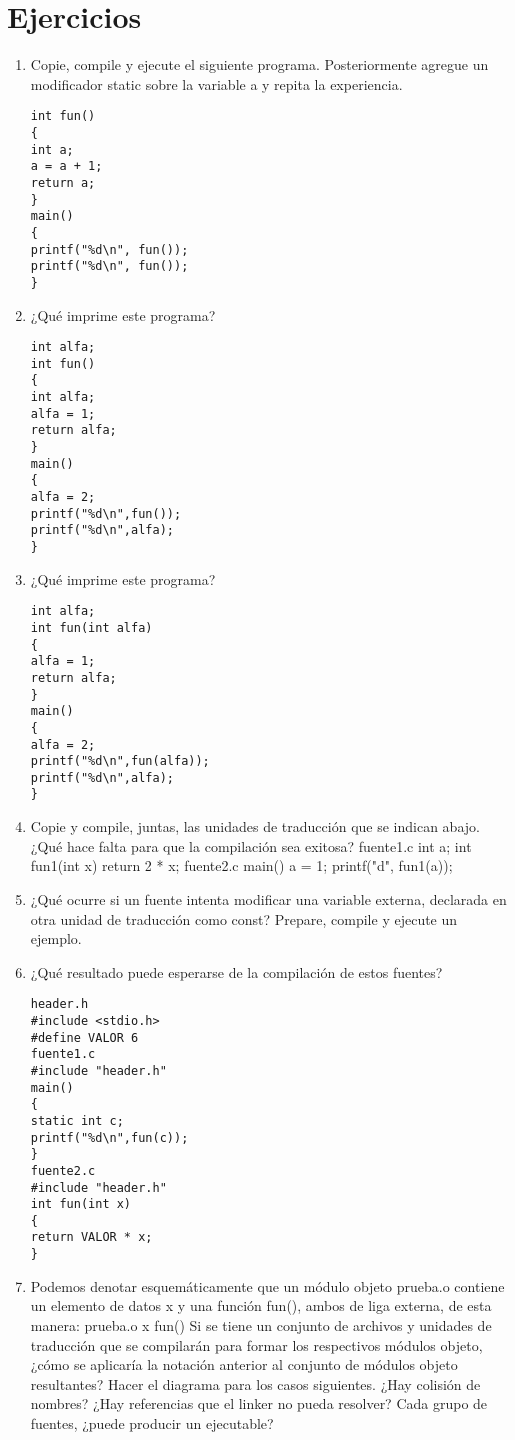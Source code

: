 \section{Ejercicios}
\begin{enumerate}
	\item Copie, compile y ejecute el siguiente programa. Posteriormente agregue un modificador static sobre
la variable a y repita la experiencia.
\begin{lstlisting}
int fun()
{
int a;
a = a + 1;
return a;
}
main()
{
printf("%d\n", fun());
printf("%d\n", fun());
}
\end{lstlisting}
\item ¿Qué imprime este programa?
\begin{lstlisting}
int alfa;
int fun()
{
int alfa;
alfa = 1;
return alfa;
}
main()
{
alfa = 2;
printf("%d\n",fun());
printf("%d\n",alfa);
}
\end{lstlisting}
\item ¿Qué imprime este programa?
\begin{lstlisting}
int alfa;
int fun(int alfa)
{
alfa = 1;
return alfa;
}
main()
{
alfa = 2;
printf("%d\n",fun(alfa));
printf("%d\n",alfa);
}
\end{lstlisting}
 \item Copie y compile, juntas, las unidades de traducción que se indican abajo. ¿Qué hace falta para que
la compilación sea exitosa?
fuente1.c
int a;
int fun1(int x)
{
return 2 * x;
}
fuente2.c
main()
{
a = 1;
printf("d\n", fun1(a));
}
\item ¿Qué ocurre si un fuente intenta modificar una variable externa, declarada en otra unidad de
traducción como const? Prepare, compile y ejecute un ejemplo.
\item ¿Qué resultado puede esperarse de la compilación de estos fuentes?
\begin{lstlisting}
header.h
#include <stdio.h>
#define VALOR 6
fuente1.c
#include "header.h"
main()
{
static int c;
printf("%d\n",fun(c));
}
fuente2.c
#include "header.h"
int fun(int x)
{
return VALOR * x;
}
\end{lstlisting}
\item Podemos denotar esquemáticamente que un módulo objeto prueba.o contiene un elemento de datos
x y una función fun(), ambos de liga externa, de esta manera:
prueba.o
x
fun()
Si se tiene un conjunto de archivos y unidades de traducción que se compilarán para formar los
respectivos módulos objeto, ¿cómo se aplicaría la notación anterior al conjunto de módulos objeto
resultantes? Hacer el diagrama para los casos siguientes. ¿Hay colisión de nombres? ¿Hay referencias que el linker no pueda resolver? Cada grupo de fuentes, ¿puede producir un ejecutable?

\end{enumerate}
